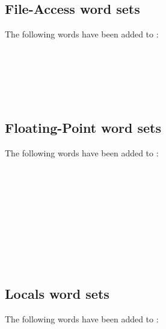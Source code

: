 \subsection{File-Access word sets}
The following words have been added to :

\begin{minipage}[t]{0.3\linewidth}
	\\
\end{minipage}
\hfill
\begin{minipage}[t]{0.3\linewidth}
	 \\
\end{minipage}
\hfill
\begin{minipage}[t]{0.3\linewidth}
	 \\
\end{minipage}

\subsection{Floating-Point word sets}
The following words have been added to :

\begin{minipage}[t]{0.3\linewidth}
	 \\
	 \\
	 \\
\end{minipage}
\hfill
\begin{minipage}[t]{0.3\linewidth}
	 \\
	 \\
\end{minipage}
\hfill
\begin{minipage}[t]{0.3\linewidth}
	 \\
	 \\
\end{minipage}

\subsection{Locals word sets}
The following words have been added to :

\\

